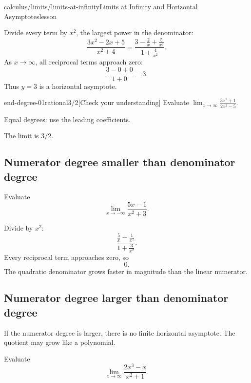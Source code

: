 \documentclass[11pt,openany]{book}
\theoremstyle{bgplain}
\newcounter{bgexample}[chapter]
\newcounter{bgcheck}[section]
\begin{document}
\begin{webpage}{calculus/limits/limits-at-infinity}{Limits at Infinity and Horizontal Asymptotes}{lesson}
\begin{bgexample}[title={Divide by the largest denominator power}]
\begin{bgsolution}
Divide every term by \(x^2\), the largest power in the denominator:
\[
\frac{3x^2-2x+5}{x^2+4}
=\frac{3-\frac2x+\frac5{x^2}}{1+\frac4{x^2}}.
\]
As \(x\to\infty\), all reciprocal terms approach zero:
\[
  \frac{3-0+0}{1+0}=\boxed{3}.
\]
Thus \(y=3\) is a horizontal asymptote.
\end{bgsolution}


\begin{bgcheck}{end-degree-01}{rational}{3/2}[Check your understanding]
Evaluate \(\lim_{x\to\infty}\frac{3x^2+1}{2x^2-5}\).
\begin{bghint}
Equal degrees: use the leading coefficients.
\end{bghint}
\begin{bgreveal}
The limit is \(3/2\).
\end{bgreveal}
\end{bgcheck}


\end{bgexample}

\subsection{Numerator degree smaller than denominator degree}

\begin{bgexample}[title={The denominator wins}]
Evaluate
\[
  \lim_{x\to-\infty}\frac{5x-1}{x^2+3}.
\]

\begin{bgsolution}
Divide by \(x^2\):
\[
  \frac{\frac5x-\frac1{x^2}}{1+\frac3{x^2}}.
\]
Every reciprocal term approaches zero, so
\[
  \boxed{0}.
\]
The quadratic denominator grows faster in magnitude than the linear numerator.
\end{bgsolution}
\end{bgexample}

\subsection{Numerator degree larger than denominator degree}

If the numerator degree is larger, there is no finite horizontal asymptote. The quotient may grow like a polynomial.

\begin{bgexample}[title={Unbounded end behavior}]
Evaluate
\[
  \lim_{x\to\infty}\frac{2x^3-x}{x^2+1}.
\]


\end{bgexample}
\end{webpage}
\end{document}
